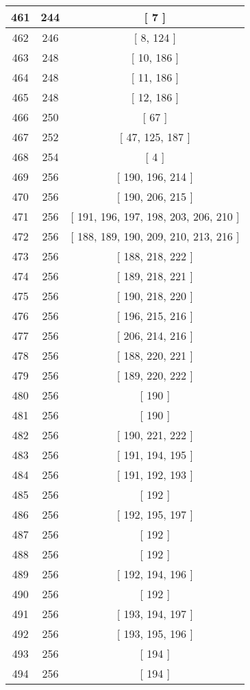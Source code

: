 \begin{center}
\begin{longtable}[H]{|| c c c ||}
\hline
461 & 244 & [ 7 ] \\ 
\hline
462 & 246 & [ 8, 124 ] \\ 
\hline
463 & 248 & [ 10, 186 ] \\ 
\hline
464 & 248 & [ 11, 186 ] \\ 
\hline
465 & 248 & [ 12, 186 ] \\ 
\hline
466 & 250 & [ 67 ] \\ 
\hline
467 & 252 & [ 47, 125, 187 ] \\ 
\hline
468 & 254 & [ 4 ] \\ 
\hline
469 & 256 & [ 190, 196, 214 ] \\ 
\hline
470 & 256 & [ 190, 206, 215 ] \\ 
\hline
471 & 256 & [ 191, 196, 197, 198, 203, 206, 210 ] \\ 
\hline
472 & 256 & [ 188, 189, 190, 209, 210, 213, 216 ] \\ 
\hline
473 & 256 & [ 188, 218, 222 ] \\ 
\hline
474 & 256 & [ 189, 218, 221 ] \\ 
\hline
475 & 256 & [ 190, 218, 220 ] \\ 
\hline
476 & 256 & [ 196, 215, 216 ] \\ 
\hline
477 & 256 & [ 206, 214, 216 ] \\ 
\hline
478 & 256 & [ 188, 220, 221 ] \\ 
\hline
479 & 256 & [ 189, 220, 222 ] \\ 
\hline
480 & 256 & [ 190 ] \\ 
\hline
481 & 256 & [ 190 ] \\ 
\hline
482 & 256 & [ 190, 221, 222 ] \\ 
\hline
483 & 256 & [ 191, 194, 195 ] \\ 
\hline
484 & 256 & [ 191, 192, 193 ] \\ 
\hline
485 & 256 & [ 192 ] \\ 
\hline
486 & 256 & [ 192, 195, 197 ] \\ 
\hline
487 & 256 & [ 192 ] \\ 
\hline
488 & 256 & [ 192 ] \\ 
\hline
489 & 256 & [ 192, 194, 196 ] \\ 
\hline
490 & 256 & [ 192 ] \\ 
\hline
491 & 256 & [ 193, 194, 197 ] \\ 
\hline
492 & 256 & [ 193, 195, 196 ] \\ 
\hline
493 & 256 & [ 194 ] \\ 
\hline
494 & 256 & [ 194 ] \\ 

\end{longtable}
\end{center}
